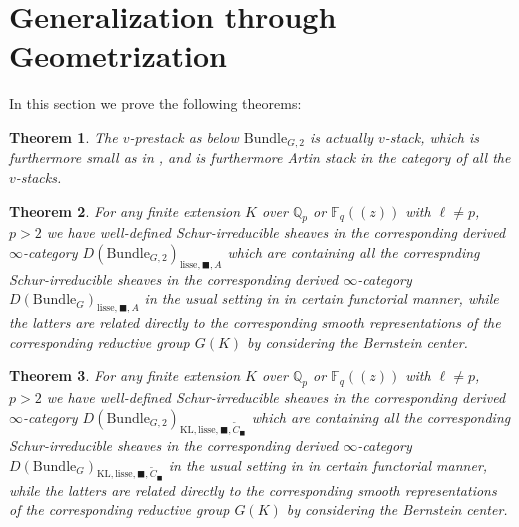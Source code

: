 \documentclass[12pt]{book}
\newtheorem{theorem}{Theorem}
\theoremstyle{definition}
\begin{document}
\newpage
\section{Generalization through Geometrization}

\noindent In this section we prove the following theorems:

\begin{theorem}
The $v$-prestack as below $\mathrm{Bundle}_{G,2}$ is actually $v$-stack, which is furthermore small as in \cite{FS}, and is furthermore Artin stack in the category of all the $v$-stacks.
\end{theorem}

\begin{theorem}
For any finite extension $K$ over $\mathbb{Q}_p$ or $\mathbb{F}_q((z))$ with $\ell\neq p$, $p>2$ we have well-defined Schur-irreducible sheaves in the corresponding derived $\infty$-category $D(\mathrm{Bundle}_{G,2})_{\text{lisse},\blacksquare,A}$ which are containing all the correspnding Schur-irreducible sheaves in the corresponding derived $\infty$-category $D(\mathrm{Bundle}_{G})_{\text{lisse},\blacksquare,A}$ in the usual setting in \cite{FS} in certain functorial manner, while the latters are related directly to the corresponding smooth representations of the corresponding reductive group $G(K)$ by considering the Bernstein center.
\end{theorem}

\begin{theorem}
For any finite extension $K$ over $\mathbb{Q}_p$ or $\mathbb{F}_q((z))$ with $\ell\neq p$, $p>2$ we have well-defined Schur-irreducible sheaves in the corresponding derived $\infty$-category $D(\mathrm{Bundle}_{G,2})_{\text{KL},\mathrm{lisse},\blacksquare,\widetilde{C}_\blacksquare}$ which are containing all the corresponding Schur-irreducible sheaves in the corresponding derived $\infty$-category $D(\mathrm{Bundle}_{G})_{\text{KL},\mathrm{lisse},\blacksquare,\widetilde{C}_\blacksquare}$ in the usual setting in \cite{FS} in certain functorial manner, while the latters are related directly to the corresponding smooth representations of the corresponding reductive group $G(K)$ by considering the Bernstein center.
\end{theorem}
\end{document}
